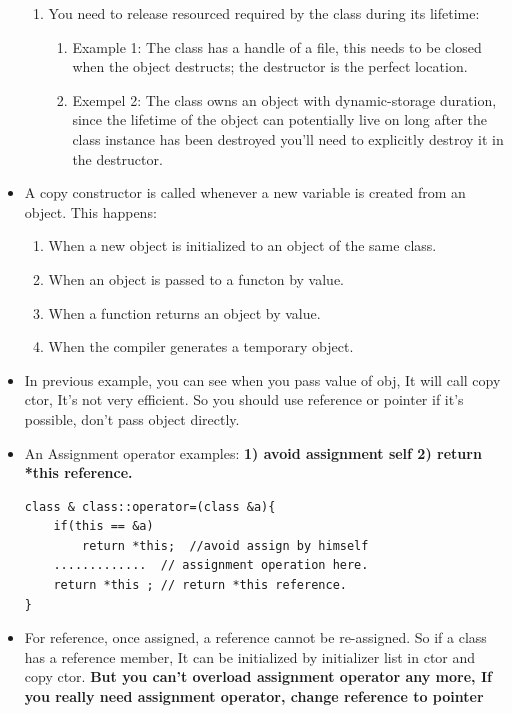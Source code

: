 \documentclass[a4paper,11pt,twoside]{book}
\begin{document}
\begin{itemize}
\begin{enumerate}
		\item You need to release resourced required by the class during its lifetime:
		\begin{enumerate}
			\item Example 1: The class has a handle of a file, this needs to be closed when the object destructs; the destructor is the perfect location.
			
			\item Exempel 2: The class owns an object with dynamic-storage duration, since the lifetime of the object can potentially live on long after the class instance has been destroyed you'll need to explicitly destroy it in the destructor.
		\end{enumerate}
	\end{enumerate}
	
	
	\item A copy constructor is called whenever a new variable is created from an object. This happens:
	
	\begin{enumerate}
		\item When a new object is initialized to an object of the same class.
		\item When an object is passed to a functon by value.
		\item When a function returns an object by value.
		\item When the compiler generates a temporary object.
	\end{enumerate}
	
	\item In previous example, you can see when you pass value of obj, It will call copy ctor, It's not very efficient. So you should use reference or pointer if it's possible, don't pass object directly.
	
	
	\item An Assignment operator examples: \textbf{1) avoid assignment self 2) return *this reference. }
\begin{lstlisting}[numbers=none]
class & class::operator=(class &a){
	if(this == &a)
		return *this;  //avoid assign by himself
	.............  // assignment operation here.
	return *this ; // return *this reference.
}
\end{lstlisting}
	
	\item For reference, once assigned, a reference cannot be re-assigned. So if a class has a reference member, It can be initialized by initializer list in ctor and copy ctor. \textbf{But you can't overload assignment operator any more, If you really need assignment operator, change reference to pointer}
\end{itemize}
\end{document}
